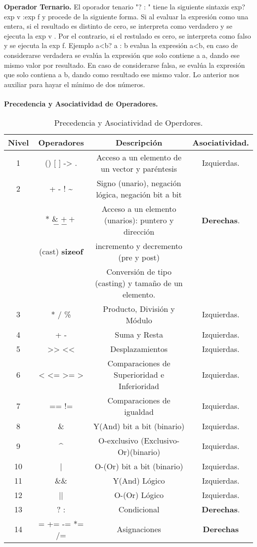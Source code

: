 \textbf{Operador Ternario.}
El oporador tenario "? : " tiene la siguiente sintaxis exp?exp v :exp f y procede de la siguiente forma. Si al evaluar la expresión como una entera, si el resultado es distinto de cero, se interpreta como verdadero y se ejecuta la exp v . Por el contrario, si el restulado es cero, se interpreta como falso y se ejecuta la exp f. Ejemplo a<b? a : b evalua la expresión a<b, en caso de considerarse verdadera se evalúa la expresión que solo contiene a a, dando ese mismo valor por resultado. En caso de considerarse falsa, se evalúa la expresión que solo contiena a b, dando como resultado ese mismo valor. Lo anterior nos auxiliar para hayar el mı́nimo de dos números.\\
\\
\textbf{Precedencia y Asociatividad de Operadores.}
\begin{table}[H]
        \centering
        \begin{tabular}{ c | c | c | c }

Nivel & Operadores & Descripción & Asociatividad. \\ \hline
1 & () [ ] -> . & Acceso a un elemento de un vector y paréntesis & Izquierdas. \\ \hline
2 & + - ! \textasciitilde{}  & Signo (unario), negación lógica, negación bit a bit& \\
  & * \& $++$ $--$ & Acceso a un elemento (unarios): puntero y dirección & \textbf{Derechas}. \\
  & (cast) \textbf{sizeof} & incremento y decremento (pre y post) &  \\
  &   & Conversión de tipo (casting) y tamaño de un elemento. \\ \hline
3 & * / \% & Producto, División y Módulo & Izquierdas. \\ \hline
4 & + - & Suma y Resta & Izquierdas. \\ \hline
5 & >> << & Desplazamientos & Izquierdas. \\ \hline
6 & < <= >= > & Comparaciones de Superioridad e Inferioridad & Izquierdas. \\ \hline
7 & == != & Comparaciones de igualdad & Izquierdas. \\ \hline
8 & \& & Y(And) bit a bit (binario) & Izquierdas. \\ \hline
9 & \textasciicircum{} & O-exclusivo (Exclusivo-Or)(binario) & Izquierdas. \\ \hline
10 & | & O-(Or) bit a bit (binario) & Izquierdas. \\ \hline
11 & \&\& & Y(And) Lógico & Izquierdas. \\ \hline
12 & || & O-(Or) Lógico & Izquierdas. \\ \hline
13 & ? : & Condicional &\textbf{Derechas}. \\ \hline
14 & = += -= *= /= & Asignaciones & \textbf{Derechas} \\ \hline
\end{tabular}
\\
\caption{Precedencia y Asociatividad de Operdores.}
\end{table}
\pagebreak

